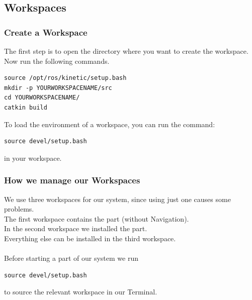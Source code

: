 \documentclass[main.tex]{subfiles}
\begin{document}
	\subsection{Workspaces}
	\subsubsection{Create a Workspace}
	The first step is to open the directory where you want to create the workspace.\\
	Now run the following commands.
	\begin{lstlisting}
source /opt/ros/kinetic/setup.bash
mkdir -p YOURWORKSPACENAME/src
cd YOURWORKSPACENAME/
catkin build 
\end{lstlisting}
	
	To load the environment of a workspace, you can run the command:
	\begin{lstlisting}
source devel/setup.bash
\end{lstlisting}
	in your workspace.
	
	\subsubsection{How we manage our Workspaces} \label{workspace_management}
	
	We use three workspaces for our system, since using just one causes some problems.\\
	The first workspace contains the  part (without Navigation).\\
	In the second workspace we installed the  part.\\
	Everything else can be installed in the third workspace.\\
	\\
	Before starting a part of our system we run 
	\begin{lstlisting}
source devel/setup.bash
\end{lstlisting}
to source the relevant workspace in our Terminal.
	
\end{document}
